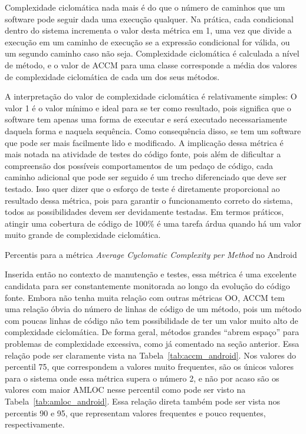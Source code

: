 Complexidade ciclomática nada mais é do que o número de caminhos que um software pode seguir dada uma execução qualquer. Na prática, cada condicional dentro do sistema incrementa o valor desta métrica em 1, uma vez que divide a execução em um caminho de execução se a expressão condicional for válida, ou um segundo caminho caso não seja. Complexidade ciclomática é calculada a nível de método, e o valor de ACCM para uma classe corresponde a média dos valores de complexidade ciclomática de cada um dos seus métodos.

A interpretação do valor de complexidade ciclomática é relativamente simples: O valor 1 é o valor mínimo e ideal para se ter como resultado, pois significa que o software tem apenas uma forma de executar e será executado necessariamente daquela forma e naquela sequência. Como consequência disso, se tem um software que pode ser mais facilmente lido e modificado. A implicação dessa métrica é mais notada na atividade de testes do código fonte, pois além de dificultar a compreensão dos possíveis comportamentos de um pedaço de código, cada caminho adicional que pode ser seguido é um trecho diferenciado que deve ser testado. Isso quer dizer que o esforço de teste é diretamente proporcional ao resultado dessa métrica, pois para garantir o funcionamento correto do sistema, todos as possibilidades devem ser devidamente testadas. Em termos práticos, atingir uma cobertura de código de 100\% é uma tarefa árdua quando há um valor muito grande de complexidade ciclomática.

\begin{table}[!htb]

\caption{Percentis para a métrica \textit{Average Cyclomatic Complexity per Method} no Android}
\label{tab:accm_android}
\end{table}

Inserida então no contexto de manutenção e testes, essa métrica é uma excelente candidata para ser constantemente monitorada ao longo da evolução do código fonte. Embora não tenha muita relação com outras métricas OO, ACCM tem uma relação óbvia do número de linhas de código de um método, pois um método com poucas linhas de código não tem possibilidade de ter um valor muito alto de complexidade ciclomática. De forma geral, métodos grandes ``abrem espaço'' para problemas de complexidade excessiva, como já comentado na seção anterior. Essa relação pode ser claramente vista na Tabela~\ref{tab:accm_android}. Nos valores do percentil 75, que correspondem a valores muito frequentes, são os únicos valores para o sistema onde essa métrica supera o número 2, e não por acaso são os valores com maior AMLOC nesse percentil como pode ser visto na Tabela~\ref{tab:amloc_android}. Essa relação direta também pode ser vista nos percentis 90 e 95, que representam valores frequentes e pouco requentes, respectivamente.

